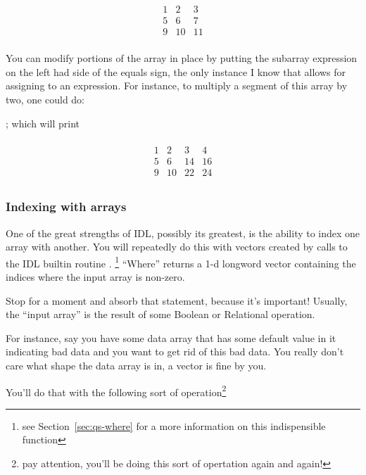   \[ \begin{array}{ccc}\\
        1 & 2 & 3 \\
        5 & 6 & 7   \\  
        9 & 10 & 11 \\
        \end{array} \]
  

  You can modify portions of the array in place by putting the
  subarray expression on the left had side of the equals sign, the
  only instance I know that allows for assigning to an expression. For
  instance, to multiply a segment of this array by two, one could do:

    ; which will print

  \[ \begin{array}{cccc}\\
        1 & 2 & 3   & 4 \\
        5 & 6 & 14   & 16 \\
        9 & 10 & 22 & 24 \\
        \end{array} \]

\subsubsection{Indexing with arrays}

  One of the great strengths of IDL, possibly its greatest, is the
  ability to index one array with another. You will repeatedly do this
  with vectors created by calls to the IDL builtin routine
  . \footnote{see Section~\ref{sec:qs-where} for a more information on
  this indispensible function} ``Where'' returns a
  1-d longword vector containing the indices where the input array is
  non-zero. 

  Stop for a moment and absorb that statement, because it's important!
  Usually, the ``input array'' is the result of some Boolean or Relational
  operation.

  For instance, say you have some data array that has some default
  value in it indicating bad data and you want to get rid of this
  bad data. You really don't care what shape the data array is in, a
  vector is fine by you.

  You'll do that with the following sort of operation\footnote{pay
  attention, you'll be doing this sort of opertation again and again!}

